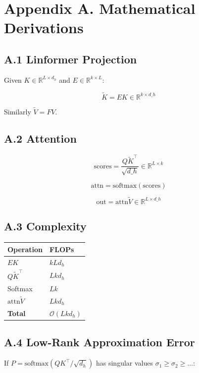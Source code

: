 \section{Appendix A. Mathematical Derivations}

\subsection{A.1 Linformer Projection}

Given $K \in \mathbb{R}^{L \times d_h}$ and $E \in \mathbb{R}^{k \times L}$:

\[
\tilde{K} = E K \in \mathbb{R}^{k \times d\_h}
\tag{A.1}
\]

Similarly $\tilde{V} = F V$.

\subsection{A.2 Attention}

\[
\text{scores} = \frac{Q \tilde{K}^\top}{\sqrt{d\_h}} \in \mathbb{R}^{L \times k}
\tag{A.2}
\]

\[
\text{attn} = \text{softmax}(\text{scores})
\tag{A.3}
\]

\[
\text{out} = \text{attn} \tilde{V} \in \mathbb{R}^{L \times d\_h}
\tag{A.4}
\]

\subsection{A.3 Complexity}

\begin{table}[H]
\centering
\small
\begin{tabular}{ll}
\toprule
\textbf{Operation} & \textbf{FLOPs} \\
\midrule
$E K$ & $k L d_h$ \\
$Q \tilde{K}^\top$ & $L k d_h$ \\
Softmax & $L k$ \\
$\text{attn} \tilde{V}$ & $L k d_h$ \\
\textbf{Total} & $\mathcal{O}(L k d_h)$ \\
\bottomrule
\end{tabular}
\end{table}

\subsection{A.4 Low-Rank Approximation Error}

If $P = \text{softmax}(QK^\top/\sqrt{d_h})$ has singular values $\sigma_1 \geq \sigma_2 \geq \dots$:

